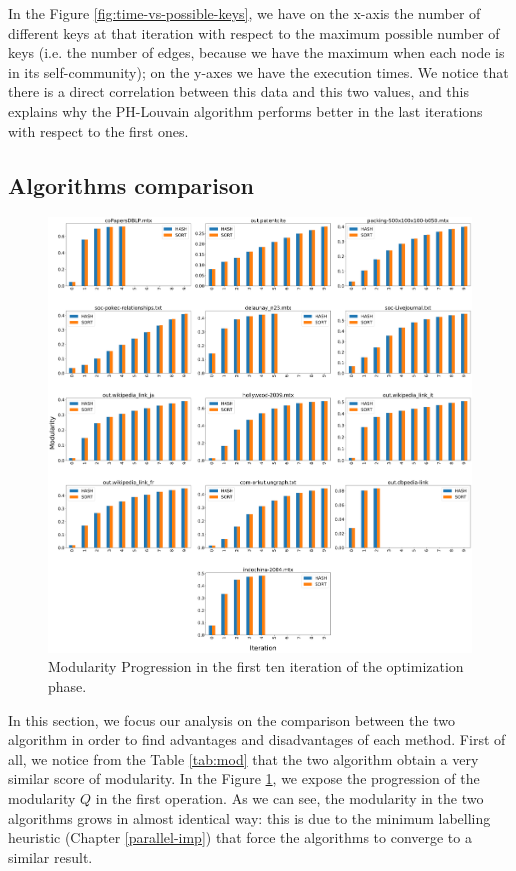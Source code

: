 \noindent In the Figure \ref{fig:time-vs-possible-keys}, we have on the x-axis the number of different keys at that iteration with respect to the maximum possible number of keys (i.e. the number of edges, because we have the maximum when each node is in its self-community); on the y-axes we have the execution times. We notice that there is a direct correlation between this data and this two values, and this explains why the PH-Louvain algorithm performs better in the last iterations with respect to the first ones. 
\newpage
\subsection{Algorithms comparison}\label{alg-comp}
\begin{figure}[h]
	\centering
	\includegraphics[width=1\linewidth]{0-resources/modularity-progression}
	\caption{Modularity Progression in the first ten iteration of the optimization phase.}
	\label{fig:modularity-progression}
\end{figure} 
\noindent In this section, we focus our analysis on the comparison between the two algorithm in order to find advantages and disadvantages of each method. 
First of all, we notice from the Table \ref{tab:mod} that the two algorithm obtain a very similar score of modularity. In the Figure \ref{fig:modularity-progression}, we expose the progression of the modularity $Q$ in the first operation. As we can see, the modularity in the two algorithms grows in almost identical way: this is due to the minimum labelling heuristic (Chapter \ref{parallel-imp}) that force the algorithms to converge to a similar result. \\
